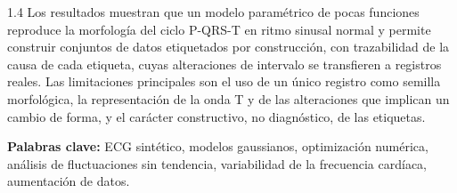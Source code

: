 \begin{spacing}{1.4}
Los resultados muestran que un modelo paramétrico de pocas funciones reproduce la morfología del ciclo P-QRS-T en ritmo sinusal normal y permite construir conjuntos de datos etiquetados por construcción, con trazabilidad de la causa de cada etiqueta, cuyas alteraciones de intervalo se transfieren a registros reales. Las limitaciones principales son el uso de un único registro como semilla morfológica, la representación de la onda T y de las alteraciones que implican un cambio de forma, y el carácter constructivo, no diagnóstico, de las etiquetas.


\vspace{0.5cm}

\noindent\textbf{Palabras clave:} ECG sintético, modelos gaussianos, optimización numérica, análisis de fluctuaciones sin tendencia, variabilidad de la frecuencia cardíaca, aumentación de datos.

\end{spacing}
